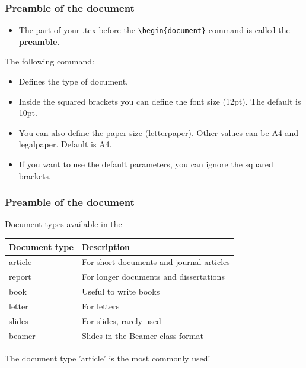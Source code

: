 \documentclass{beamer}
\def\openesc{\color{blue}}
\def\closeesc{\color{black}}
\def\vbdelim{\catcode`<=\active\catcode`>=\active%
\def<{\openesc}
\def>{\closeesc}}
\begin{document}
\begin{frame}[fragile]
\frametitle{Preamble of the document}
\begin{itemize}
\item The part of your .tex before the \verb|\begin{document}| command is called the \textbf{preamble}.
\end{itemize}
The following command: 
\begin{framed}
\begin{minipage}[b]{.4\textwidth}
\end{minipage}%
\end{framed}

\begin{itemize}
\item Defines the type of document.\\
\item Inside the squared brackets you can define the font size (12pt). The default is 10pt. \\
\item You can also define the paper size (letterpaper). Other values can be A4 and legalpaper. Default is A4. \\
\item If you want to use the default parameters, you can ignore the squared brackets.
\end{itemize}
\end{frame}

\begin{frame}[fragile]
\frametitle{Preamble of the document}
Document types available in the \color{blue}{\verb|\documentclass|} \color{black}{command:} \\
\vspace{1cm}
\begin{tabular}{ll}
\textbf{Document type} & \textbf{Description} \\ \hline
article & For short documents and journal articles \\ 
report & For longer documents and dissertations \\ 
book & Useful to write books \\
letter & For letters \\ 
slides & For slides, rarely used \\ 
beamer & Slides in the Beamer class format \\ \hline
\end{tabular}

The document type 'article' is the most commonly used!
\end{frame}
\end{document}
